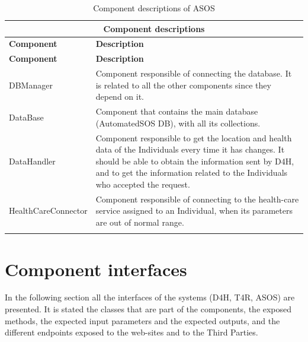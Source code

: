 \documentclass[a4paper, hidelinks, 12pt]{report}
\begin{document}
		\begin{longtable}{l p{}}
			\hline\hline
			\multicolumn{2}{c}{\textbf{Component descriptions}} \\
			\hline
			\textbf{Component} & \textbf{Description} \\ [0.5ex]
			\hline
			\endfirsthead
			\hline
			\textbf{Component} & \textbf{Description} \\ [0.5ex]
			\hline
			\endhead
			DBManager & Component responsible of connecting the database. It is related to all the other components since they depend on it.\\
			DataBase & Component that contains the main database (AutomatedSOS DB), with all its collections.\\
			DataHandler & Component responsible to get the location and health data of the Individuals every time it has changes. It should be able to obtain the information sent by D4H, and to get the information related to the Individuals who accepted the request.\\
			HealthCareConnector & Component responsible of connecting to the health-care service assigned to an Individual, when its parameters are out of normal range.\\
			\hline
			\caption{Component descriptions of ASOS}
			\label{table:asos_component_descriptions}
		\end{longtable}
		
	\section{Component interfaces}
	In the following section all the interfaces of the systems (D4H, T4R, ASOS) are presented. It is stated the classes that are part of the components, the exposed methods, the expected input parameters and the expected outputs, and the different endpoints exposed to the web-sites and to the Third Parties.
\end{document}
